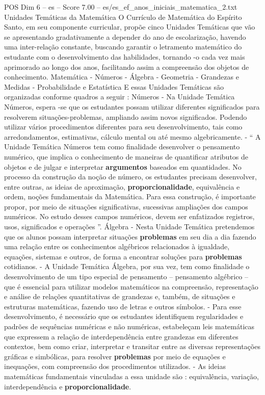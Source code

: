 \begin{textsample}{POS Dim 6 – es – Score 7.00 – es/es\_ef\_anos\_iniciais\_matematica\_2.txt}
Unidades Temáticas da Matemática O Currículo de Matemática do Espírito Santo, em seu componente curricular, propõe cinco Unidades Temáticas que vão se apresentando gradativamente a depender do ano de escolarização, havendo uma inter-relação constante, buscando garantir o letramento matemático do estudante com o desenvolvimento das habilidades, tornando -o cada vez mais aprimorado ao longo dos anos, facilitando assim a compreensão dos objetos de conhecimento.
Matemática - Números - Álgebra - Geometria - Grandezas e Medidas - Probabilidade e Estatística E essas Unidades Temáticas são organizadas conforme quadros a seguir : Números - Na Unidade Temática Números, espera -se que os estudantes possam utilizar diferentes significados para resolverem situações-problemas, ampliando assim novos significados.
Podendo utilizar vários procedimentos diferentes para seu desenvolvimento, tais como arredondamentos, estimativas, cálculo mental ou até mesmo algebricamente. - “ A Unidade Temática Números tem como finalidade desenvolver o pensamento numérico, que implica o conhecimento de maneiras de quantificar atributos de objetos e de julgar e interpretar \textbf{argumentos} baseados em quantidades.
No processo da construção da noção de número, os estudantes precisam desenvolver, entre outras, as ideias de aproximação, \textbf{proporcionalidade}, equivalência e ordem, noções fundamentais da Matemática.
Para essa construção, é importante propor, por meio de situações significativas, sucessivas ampliações dos campos numéricos.
No estudo desses campos numéricos, devem ser enfatizados registros, usos, significados e operações ”.
Álgebra - Nesta Unidade Temática pretendemos que os alunos possam interpretar situações \textbf{problemas} em seu dia a dia fazendo uma relação entre os conhecimentos algébricos relacionados à igualdade, equações, sistemas e outros, de forma a encontrar soluções para \textbf{problemas} cotidianos. - A Unidade Temática Álgebra, por sua vez, tem como finalidade o desenvolvimento de um tipo especial de pensamento – pensamento algébrico – que é essencial para utilizar modelos matemáticos na compreensão, representação e análise de relações quantitativas de grandezas e, também, de situações e estruturas matemáticas, fazendo uso de letras e outros símbolos. - Para esse desenvolvimento, é necessário que os estudantes identifiquem regularidades e padrões de sequências numéricas e não numéricas, estabeleçam leis matemáticas que expressem a relação de interdependência entre grandezas em diferentes contextos, bem como criar, interpretar e transitar entre as diversas representações gráficas e simbólicas, para resolver \textbf{problemas} por meio de equações e inequações, com compreensão dos procedimentos utilizados. - As ideias matemáticas fundamentais vinculadas a essa unidade são : equivalência, variação, interdependência e \textbf{proporcionalidade}.

\end{textsample}
